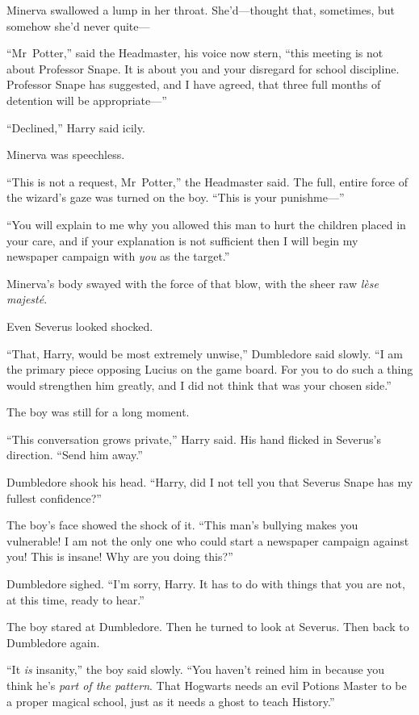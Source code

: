 Minerva swallowed a lump in her throat. She’d—thought that, sometimes, but somehow she’d never quite—

“Mr~Potter,” said the Headmaster, his voice now stern, “this meeting is not about Professor Snape. It is about you and your disregard for school discipline. Professor Snape has suggested, and I have agreed, that three full months of detention will be appropriate—”

“Declined,” Harry said icily.

Minerva was speechless.

“This is not a request, Mr~Potter,” the Headmaster said. The full, entire force of the wizard’s gaze was turned on the boy. “This is your punishme—”

“You will explain to me why you allowed this man to hurt the children placed in your care, and if your explanation is not sufficient then I will begin my newspaper campaign with \emph{you} as the target.”

Minerva’s body swayed with the force of that blow, with the sheer raw \emph{lèse majesté}.

Even Severus looked shocked.

“That, Harry, would be most extremely unwise,” Dumbledore said slowly. “I am the primary piece opposing Lucius on the game board. For you to do such a thing would strengthen him greatly, and I did not think that was your chosen side.”

The boy was still for a long moment.

“This conversation grows private,” Harry said. His hand flicked in Severus’s direction. “Send him away.”

Dumbledore shook his head. “Harry, did I not tell you that Severus Snape has my fullest confidence?”

The boy’s face showed the shock of it. “This man’s bullying makes you vulnerable! I am not the only one who could start a newspaper campaign against you! This is insane! Why are you doing this?”

Dumbledore sighed. “I’m sorry, Harry. It has to do with things that you are not, at this time, ready to hear.”

The boy stared at Dumbledore. Then he turned to look at Severus. Then back to Dumbledore again.

“It \emph{is} insanity,” the boy said slowly. “You haven’t reined him in because you think he’s \emph{part of the pattern}. That Hogwarts needs an evil Potions Master to be a proper magical school, just as it needs a ghost to teach History.”

